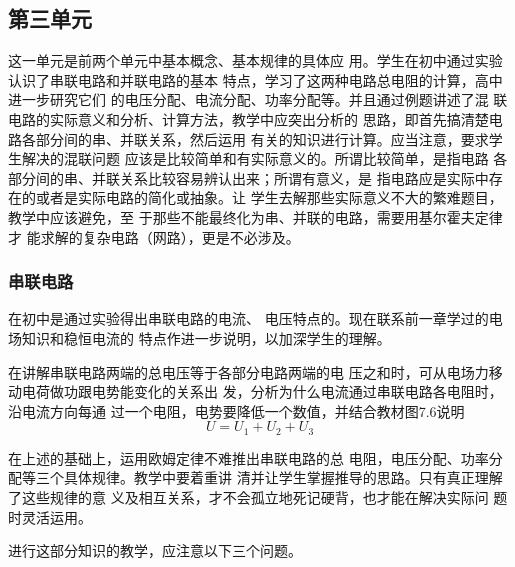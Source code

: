 \subsection{第三单元}
这一单元是前两个单元中基本概念、基本规律的具体应
用。学生在初中通过实验认识了串联电路和并联电路的基本
特点，学习了这两种电路总电阻的计算，高中进一步研究它们
的电压分配、电流分配、功率分配等。并且通过例题讲述了混
联电路的实际意义和分析、计算方法，教学中应突出分析的
思路，即首先搞清楚电路各部分间的串、并联关系，然后运用
有关的知识进行计算。应当注意，要求学生解决的混联问题
应该是比较简单和有实际意义的。所谓比较简单，是指电路
各部分间的串、并联关系比较容易辨认出来；所谓有意义，是
指电路应是实际中存在的或者是实际电路的简化或抽象。让
学生去解那些实际意义不大的繁难题目，教学中应该避免，至
于那些不能最终化为串、并联的电路，需要用基尔霍夫定律才
能求解的复杂电路（网路），更是不必涉及。

\subsubsection{串联电路}

在初中是通过实验得出串联电路的电流、
电压特点的。现在联系前一章学过的电场知识和稳恒电流的
特点作进一步说明，以加深学生的理解。

在讲解串联电路两端的总电压等于各部分电路两端的电
压之和时，可从电场力移动电荷做功跟电势能变化的关系出
发，分析为什么电流通过串联电路各电阻时，沿电流方向每通
过一个电阻，电势要降低一个数值，并结合教材图7.6说明
\[U=U_1+U_2+U_3\]

在上述的基础上，运用欧姆定律不难推出串联电路的总
电阻，电压分配、功率分配等三个具体规律。教学中要着重讲
清并让学生掌握推导的思路。只有真正理解了这些规律的意
义及相互关系，才不会孤立地死记硬背，也才能在解决实际问
题时灵活运用。

进行这部分知识的教学，应注意以下三个问题。


